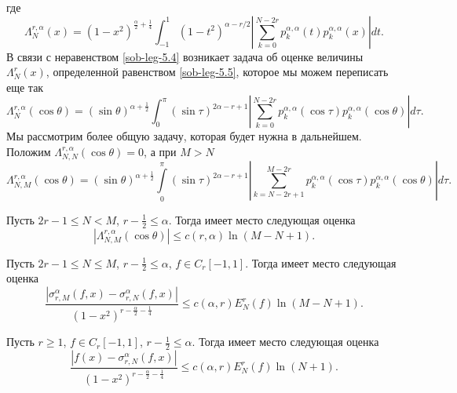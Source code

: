 где
\begin{equation}\label{sob-leg-5.5}
\Lambda^{r,\alpha}_N(x)=(1-x^2)^{\frac{\alpha}{2}+\frac14}  \int_{-1}^1(1-t^2)^{\alpha-r/2} \left|\sum_{k=0}^{N-2r}p_{k}^{\alpha,\alpha}(t)p_{k}^{\alpha,\alpha}(x)\right|dt.
\end{equation}
В связи с неравенством \eqref{sob-leg-5.4} возникает задача об оценке величины $\Lambda^r_N(x)$, определенной равенством \eqref{sob-leg-5.5}, которое мы можем переписать еще так
\begin{equation}\label{sob-leg-5.6}
\Lambda^{r,\alpha}_N(\cos\theta)=(\sin\theta)^{\alpha+\frac12}  \int_{0}^\pi(\sin\tau)^{2\alpha-r+1} \left|\sum_{k=0}^{N-2r}
p_{k}^{\alpha,\alpha}(\cos\tau)p_{k}^{\alpha,\alpha}(\cos\theta)\right|d\tau.
\end{equation}
Мы рассмотрим   более общую задачу, которая будет нужна в дальнейшем. Положим $\Lambda^{r,\alpha}_{N,N}(\cos\theta)=0$, а  при $M>N$
\begin{equation}\label{sob-leg-5.7}
\Lambda^{r,\alpha}_{N,M}(\cos\theta)=(\sin\theta)^{\alpha+\frac12}  \int\limits_{0}^\pi(\sin\tau)^{2\alpha-r+1} \left|\sum_{k=N-2r+1}^{M-2r}
p_{k}^{\alpha,\alpha}(\cos\tau)p_{k}^{\alpha,\alpha}(\cos\theta)\right|d\tau.
\end{equation}

\begin{lemma} Пусть $2r-1\le N< M$, $r-\frac12\le\alpha$. Тогда имеет место следующая оценка
\begin{equation}\label{sob-leg-5.8}
 |\Lambda^{r,\alpha}_{N,M}(\cos\theta)|\le  c(r,\alpha)\ln(M-N+1).
 \end{equation}
\end{lemma}

\begin{lemma} Пусть $2r-1\le N\le M$, $r-\frac12\le\alpha$, $f\in C_r[-1,1]$. Тогда имеет место следующая оценка
\begin{equation}\label{sob-leg-5.22}
\frac{|\sigma_{r,M}^\alpha(f,x)-\sigma_{r,N}^\alpha(f,x)|}
{(1-x^2)^{r-\frac{\alpha}{2}-\frac14}}\le
c(\alpha,r)E_N^r(f)\ln(M-N+1).
 \end{equation}
\end{lemma}
\begin{lemma} Пусть $r\ge1$, $f\in C_r[-1,1]$, $r-\frac12\le\alpha$. Тогда имеет место следующая оценка
\begin{equation}\label{sob-leg-5.24}
\frac{|f(x)-\sigma_{r,N}^\alpha(f,x)|}
{(1-x^2)^{r-\frac{\alpha}{2}-\frac14}}\le
c(\alpha,r)E_N^r(f)\ln(N+1).
 \end{equation}
\end{lemma}

